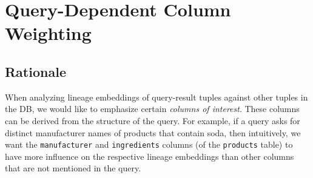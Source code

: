 


\section{Query-Dependent Column Weighting}\label{sec:query-dependent-weighting}
\subsection{Rationale} When analyzing lineage embeddings of query-result tuples against other tuples in the DB, we would like to emphasize certain \textit{columns of interest}. These columns can be derived from the structure of the query. For example, if a query asks for distinct manufacturer names of products that contain soda, then intuitively, we want the \texttt{manufacturer} and \texttt{ingredients} columns (of the \texttt{products} table) to have more influence on the respective lineage embeddings than other columns that are not mentioned in the query.\\

